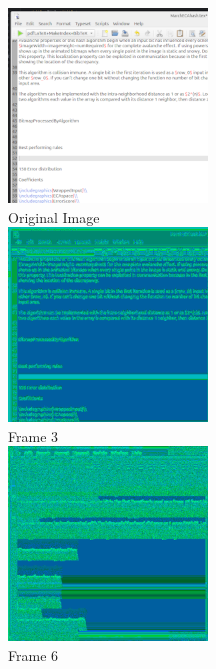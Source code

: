 \documentclass[11pt]{article}
\begin{document}
\begin{center}
\includegraphics{testScreenshot}\\
Original Image\\
\includegraphics{processedDepth3}\\
Frame 3\\
\includegraphics{processedDepth6}\\
Frame 6\\
\end{center}
\end{document}
